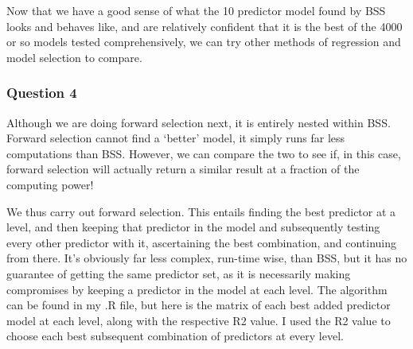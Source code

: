 \documentclass[]{article}
\begin{document}
Now that we have a good sense of what the 10 predictor model found by
BSS looks and behaves like, and are relatively confident that it is the
best of the 4000 or so models tested comprehensively, we can try other
methods of regression and model selection to compare.

\subsubsection{Question 4}\label{question-4}

Although we are doing forward selection next, it is entirely nested
within BSS. Forward selection cannot find a `better' model, it simply
runs far less computations than BSS. However, we can compare the two to
see if, in this case, forward selection will actually return a similar
result at a fraction of the computing power!

We thus carry out forward selection. This entails finding the best
predictor at a level, and then keeping that predictor in the model and
subsequently testing every other predictor with it, ascertaining the
best combination, and continuing from there. It's obviously far less
complex, run-time wise, than BSS, but it has no guarantee of getting the
same predictor set, as it is necessarily making compromises by keeping a
predictor in the model at each level. The algorithm can be found in my
.R file, but here is the matrix of each best added predictor model at
each level, along with the respective R2 value. I used the R2 value to
choose each best subsequent combination of predictors at every level.
\end{document}
